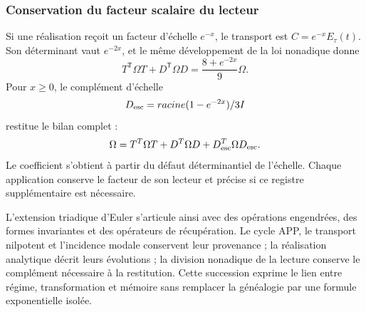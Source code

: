 \subsubsection{Conservation du facteur scalaire du lecteur}

Si une réalisation reçoit un facteur d'échelle \(e^{-x}\), le transport est \(C=e^{-x}E_\tau(t)\). Son déterminant vaut \(e^{-2x}\), et le même développement de la loi nonadique donne
\[
 T^\mathsf T\Omega T+D^\mathsf T\Omega D
 =\frac{8+e^{-2x}}9\Omega.
\]
Pour \(x\ge0\), le complément d'échelle
\[
 D_{\rm esc}=\frac{\sqrt{1-e^{-2x}}}{3}I
\]
restitue le bilan complet :
\[
 \Omega=T^\mathsf T\Omega T+D^\mathsf T\Omega D
       +D_{\rm esc}^\mathsf T\Omega D_{\rm esc}.
\]
Le coefficient s'obtient à partir du défaut déterminantiel de l'échelle. Chaque application conserve le facteur de son lecteur et précise si ce registre supplémentaire est nécessaire.

L'extension triadique d'Euler s'articule ainsi avec des opérations engendrées, des formes invariantes et des opérateurs de récupération. Le cycle APP, le transport nilpotent et l'incidence modale conservent leur provenance ; la réalisation analytique décrit leurs évolutions ; la division nonadique de la lecture conserve le complément nécessaire à la restitution. Cette succession exprime le lien entre régime, transformation et mémoire sans remplacer la généalogie par une formule exponentielle isolée.
